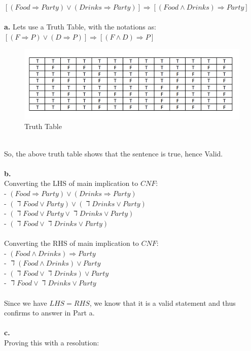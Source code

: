 \documentclass[11pt]{article}
\begin{document}
$[(Food \Rightarrow Party) \vee (Drinks \Rightarrow Party)] \Rightarrow [(Food \wedge Drinks) \Rightarrow Party]$ \\ \\
\textbf{a.} Lets use a Truth Table, with the notations as: \\
$[(F \Rightarrow P) \vee (D \Rightarrow P)] \Rightarrow [(F \wedge D) \Rightarrow P]$
\begin{figure}
  \includegraphics[width=\linewidth]{table.png}
  \caption{Truth Table}
\end{figure}
\\ So, the above truth table shows that the sentence is true, hence Valid. \\ \\
\textbf{b.} \\
Converting the LHS of main implication to $CNF$:\\
- $(Food \Rightarrow Party) \vee (Drinks \Rightarrow Party)$\\
- $(\daleth Food \vee Party) \vee (\daleth Drinks \vee Party)$ \\
- $(\daleth Food \vee Party \vee \daleth Drinks \vee Party)$ \\
- $(\daleth Food \vee \daleth Drinks \vee Party)$ \\ \\
Converting the RHS of main implication to $CNF$:\\
- $(Food \wedge Drinks) \Rightarrow Party$\\
- $\daleth (Food \wedge Drinks) \vee Party$\\
- $(\daleth Food \vee \daleth Drinks) \vee Party$ \\
- $\daleth Food \vee \daleth Drinks \vee Party$ \\ \\
Since we have $LHS = RHS$, we know that it is a valid statement and thus confirms to answer in Part a. \\ \\
\textbf{c.}\\
Proving this with a resolution:\\
\end{document}
